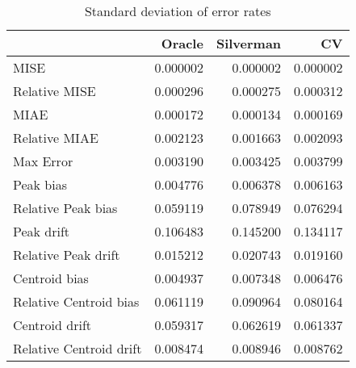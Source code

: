 \begin{table}[H]
\centering
\begin{tabular}{lrrr}
  \hline
 & Oracle & Silverman & CV \\ 
  \hline
MISE & 0.000002 & 0.000002 & 0.000002 \\ 
  Relative MISE & 0.000296 & 0.000275 & 0.000312 \\ 
  MIAE & 0.000172 & 0.000134 & 0.000169 \\ 
  Relative MIAE & 0.002123 & 0.001663 & 0.002093 \\ 
  Max Error & 0.003190 & 0.003425 & 0.003799 \\ 
  Peak bias & 0.004776 & 0.006378 & 0.006163 \\ 
  Relative Peak bias & 0.059119 & 0.078949 & 0.076294 \\ 
  Peak drift & 0.106483 & 0.145200 & 0.134117 \\ 
  Relative Peak drift & 0.015212 & 0.020743 & 0.019160 \\ 
  Centroid bias & 0.004937 & 0.007348 & 0.006476 \\ 
  Relative Centroid bias & 0.061119 & 0.090964 & 0.080164 \\ 
  Centroid drift & 0.059317 & 0.062619 & 0.061337 \\ 
  Relative Centroid drift & 0.008474 & 0.008946 & 0.008762 \\ 
   \hline
\end{tabular}
\caption{Standard deviation of error rates} 
\label{tbl:stddev_error_rates}
\end{table}
